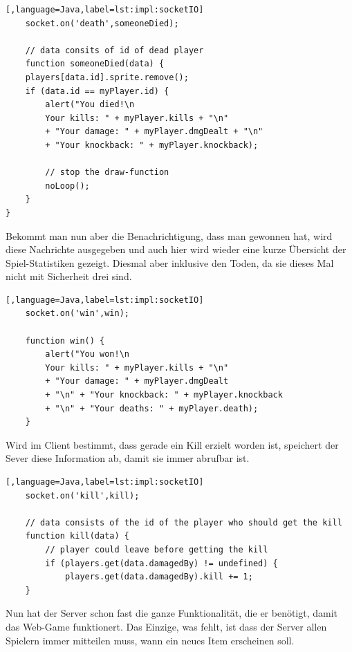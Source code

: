  \begin{lstlisting}[,language=Java,label=lst:impl:socketIO]
    socket.on('death',someoneDied);

    // data consits of id of dead player
    function someoneDied(data) {
    players[data.id].sprite.remove();
    if (data.id == myPlayer.id) {
        alert("You died!\n
        Your kills: " + myPlayer.kills + "\n" 
        + "Your damage: " + myPlayer.dmgDealt + "\n" 
        + "Your knockback: " + myPlayer.knockback);

        // stop the draw-function
        noLoop();
    }
}
 \end{lstlisting}

 Bekommt man nun aber die Benachrichtigung, dass man gewonnen hat, wird diese Nachrichte ausgegeben und auch hier wird wieder eine kurze Übersicht der Spiel-Statistiken gezeigt.
 Diesmal aber inklusive den Toden, da sie dieses Mal nicht mit Sicherheit drei sind. 

 \begin{lstlisting}[,language=Java,label=lst:impl:socketIO]
    socket.on('win',win);
     
    function win() {
        alert("You won!\n
        Your kills: " + myPlayer.kills + "\n" 
        + "Your damage: " + myPlayer.dmgDealt 
        + "\n" + "Your knockback: " + myPlayer.knockback 
        + "\n" + "Your deaths: " + myPlayer.death);
    }
 \end{lstlisting}

 Wird im Client bestimmt, dass gerade ein Kill erzielt worden ist, speichert der Sever diese Information ab, damit sie immer abrufbar ist. 
 \begin{lstlisting}[,language=Java,label=lst:impl:socketIO]
    socket.on('kill',kill);
    
    // data consists of the id of the player who should get the kill
    function kill(data) {
        // player could leave before getting the kill
        if (players.get(data.damagedBy) != undefined) {
            players.get(data.damagedBy).kill += 1;
    }

 \end{lstlisting}

 Nun hat der Server schon fast die ganze Funktionalität, die er benötigt, damit das Web-Game funktionert. 
 Das Einzige, was fehlt, ist dass der Server allen Spielern immer mitteilen muss, wann ein neues Item erscheinen soll. 

